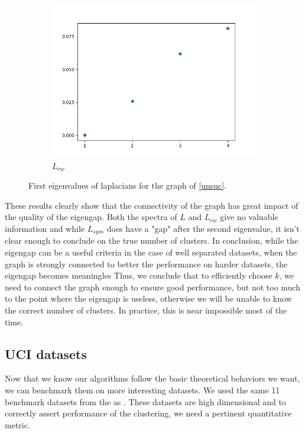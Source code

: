 \documentclass[a4paper,12pt]{article}
\theoremstyle{definition}
\theoremstyle{plain}
\begin{document}
\begin{figure}[H]
\begin{subfigure}{.3\textwidth}
		\includegraphics[width=1.1\linewidth]{figures/Fig_E6_L_rw}
		\caption{$L_{rw}$}
	\end{subfigure}
	\caption{First eigenvalues of laplacians for the graph of \ref{unsuc}.}
\end{figure}
These results clearly show that the connectivity of the graph has great impact of the quality of the eigengap. Both the spectra of $L$ and $L_{rw}$ give no valuable information and while $L_{sym}$ does have a "gap" after the second eigenvalue, it isn't clear enough to conclude on the true number of clusters.
In conclusion, while the eigengap can be a useful criteria in the case of well separated datasets, when the graph is strongly connected to better the performance on harder datasets, the eigengap becomes meaningles
Thus, we conclude that to efficiently choose $k$, we need to connect the graph enough to ensure good performance, but not too much to the point where the eigengap is useless, otherwise we will be unable to know the correct number of clusters. In practice, this is near impossible most of the time.
\subsection{UCI datasets}
Now that we know our algorithms follow the basic theoretical behaviors we want, we can benchmark them on more interesting datasets.
We used the same 11 benchmark datasets from the \cite[UCI ML repository]{UCI} as \cite[Jonckheere et.al]{GSC}. These datasets are high dimensional and to correctly assert performance of the clustering, we need a pertinent quantitative metric.
\end{document}
